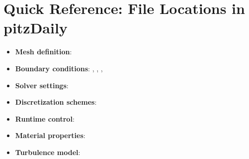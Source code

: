 \documentclass[
    parskip=half,      %
    DIV=12,            %
    headings=normal,   %
    fontsize=11pt,     %
    english            %
]{scrartcl}
\begin{document}
\section{Quick Reference: File Locations in pitzDaily}
\begin{itemize}
\item \textbf{Mesh definition}: 
\item \textbf{Boundary conditions}: , , , 
\item \textbf{Solver settings}: 
\item \textbf{Discretization schemes}: 
\item \textbf{Runtime control}: 
\item \textbf{Material properties}:  
\item \textbf{Turbulence model}: 
\end{itemize}




\end{document}
